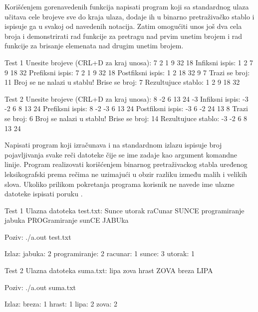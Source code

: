 \begin{Exercise}[label=701]
Korišćenjem gorenavedenih funkcija napisati program koji sa standardnog ulaza učitava cele brojeve sve do kraja ulaza, dodaje ih u binarno pretraživačko stablo i ispisuje ga u svakoj od navedenih notacija. Zatim omogućiti unos još dva cela broja i demonstrirati rad funkcije za pretragu nad prvim unetim brojem i rad funkcije za brisanje elemenata nad drugim unetim brojem. 

\begin{maxitest}
\begin{test}{Test 1}
Unesite brojeve (CRL+D za kraj unosa): 7 2 1 9 32 18
Infiksni ispis: 1 2 7 9 18 32
Prefiksni ispis: 7 2 1 9 32 18
Postfiksni ispis: 1 2 18 32 9 7
Trazi se broj: 11
Broj se ne nalazi u stablu!
Brise se broj: 7
Rezultujuce stablo: 1 2 9 18 32
\end{test}
\end{maxitest}

\begin{maxitest}
\begin{test}{Test 2}
Unesite brojeve (CRL+D za kraj unosa): 8 -2 6 13 24 -3
Infiksni ispis:  -3 -2 6 8 13 24
Prefiksni ispis: 8 -2 -3 6 13 24
Postfiksni ispis: -3 6 -2 24 13 8 
Trazi se broj: 6
Broj se nalazi u stablu!
Brise se broj: 14
Rezultujuce stablo: -3 -2 6 8 13 24
\end{test}
\end{maxitest}


\end{Exercise}

\begin{Answer}[ref=701]
\end{Answer}



\begin{Exercise}[label=702]
Napisati program koji izračunava i na standardnom izlazu ispisuje broj pojavljivanja svake reči datoteke čije se ime zadaje kao argument komandne linije. Program realizovati korišćenjem binarnog pretraživackog stabla uređenog leksikografski prema rečima ne uzimajući u obzir razliku između malih i velikih slova. Ukoliko prilikom pokretanja programa korisnik ne navede ime ulazne datoteke ispisati poruku .

\begin{miditest}
\begin{test}{Test 1}
Ulazna datoteka test.txt:
Sunce utorak raCunar SUNCE programiranje jabuka PROGramiranje sunCE JABUka

Poziv: ./a.out test.txt

Izlaz:
jabuka: 2
programiranje: 2
racunar: 1
sunce: 3
utorak: 1
\end{test}
\end{miditest}
\begin{miditest}
\begin{test}{Test 2}
Ulazna datoteka suma.txt:
lipa zova hrast ZOVA breza LIPA

Poziv: ./a.out suma.txt

Izlaz:
breza: 1
hrast: 1
lipa: 2
zova: 2
\end{test}
\end{miditest}
\end{Exercise}

